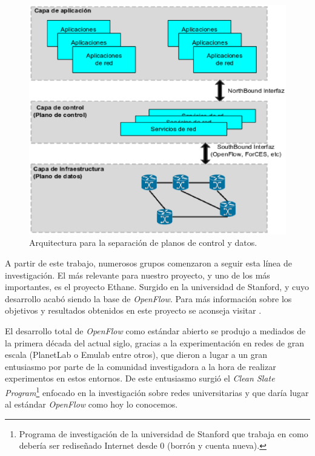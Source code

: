 \documentclass[a4paper,11pt]{book}
\begin{document}
\begin{figure}[tb]
\centering
\includegraphics[scale=0.5]{./figuras/planoscontroldatos}
\caption{Arquitectura para la separación de planos de control y datos.}\label{planoControl}
\end{figure}

\label{SDNHistoryOpenflow}
A partir de este trabajo, numerosos grupos comenzaron a seguir esta línea de investigación. El más relevante para nuestro proyecto, y uno de los más importantes, es el proyecto Ethane. Surgido en la universidad de Stanford, y cuyo desarrollo acabó siendo la base de \emph{OpenFlow}. Para más información sobre los objetivos y resultados obtenidos en este proyecto se aconseja visitar \cite{casado2007ethane}.

El desarrollo total de \emph{OpenFlow} como estándar abierto se produjo a mediados de la primera década del actual siglo, gracias a la experimentación en redes de gran escala (PlanetLab\cite{planetlab} o Emulab\cite{emulab} entre otros), que dieron a lugar a un gran entusiasmo por parte de la comunidad investigadora a la hora de realizar experimentos en estos entornos. De este entusiasmo surgió el \textit{Clean Slate Program}\footnote{Programa de investigación de la universidad de Stanford que trabaja en como debería ser rediseñado Internet desde 0 (borrón y cuenta nueva).} enfocado en la investigación sobre redes universitarias y que daría lugar al estándar \emph{OpenFlow} como hoy lo conocemos.
\end{document}
